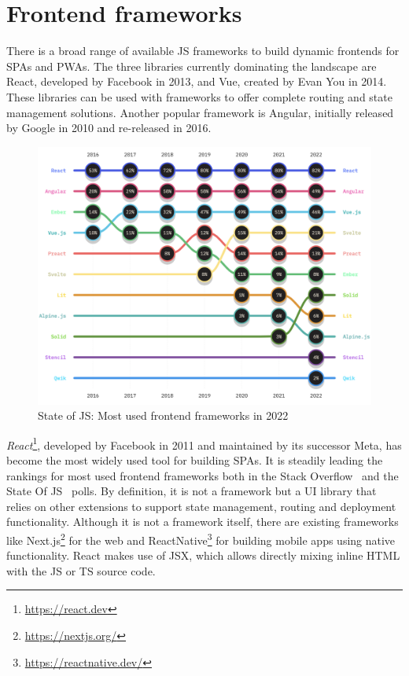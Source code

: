 \section{Frontend frameworks}
\label{sec:frontend-frameworks}

There is a broad range of available \ac{JS} frameworks to build dynamic frontends for \acp{SPA} and \acp{PWA}. The three libraries currently dominating the landscape are React, developed by Facebook in 2013, and Vue, created by Evan You in 2014.
These libraries can be used with frameworks to offer complete routing and state management solutions.
Another popular framework is Angular, initially released by Google in 2010 and re-released in 2016.

\begin{figure}[h]
    \centering
    \includegraphics[scale=0.5]{04_Artefakte/01_Abbildungen/stateofjs-usage-frontend-frameworks-2022}
    \caption[Most used frontend frameworks in 2022]{State of JS: Most used frontend frameworks in 2022 \parencite{mostUsedFrontendFrameworks22}\protect}
    \label{fig:mostUsedFrameworks}
\end{figure}

\emph{React}\footnote{\url{https://react.dev}}, developed by Facebook in 2011 and maintained by its successor Meta, has become the most widely used tool for building \acp{SPA}.
It is steadily leading the rankings for most used frontend frameworks both in the Stack Overflow~\parencite{stackOverflowPollWebFrameworks23} and the State Of JS~\parencite{mostUsedFrontendFrameworks22} polls.
By definition, it is not a framework but a \ac{UI} library that relies on other extensions to support state management, routing and deployment functionality.
Although it is not a framework itself, there are existing frameworks like Next.js\footnote{\url{https://nextjs.org/}} for the web and ReactNative\footnote{\url{https://reactnative.dev/}} for building mobile apps using native functionality.
React makes use of \ac{JSX}, which allows directly mixing inline \ac{HTML} with the \ac{JS} or \ac{TS} source code.

